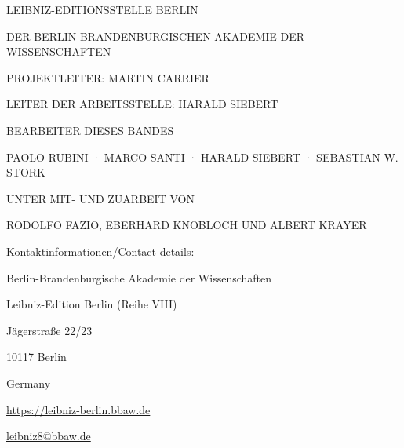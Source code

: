 \begin{titlepage}
\newpage
 \thispagestyle{empty}
\vspace{2mm}%
\par%
LEIBNIZ-EDITIONSSTELLE BERLIN
\par
DER BERLIN-BRANDENBURGISCHEN AKADEMIE DER WISSENSCHAFTEN 
\par
PROJEKTLEITER: MARTIN CARRIER
\par
LEITER DER ARBEITSSTELLE: HARALD SIEBERT
\par %
\vspace{2em}%
\par %
BEARBEITER DIESES BANDES
\par
PAOLO RUBINI · 
MARCO SANTI · HARALD SIEBERT · SEBASTIAN W. STORK
\par
UNTER MIT- UND ZUARBEIT VON
\par
RODOLFO FAZIO, EBERHARD KNOBLOCH UND ALBERT KRAYER
\par %
\vspace{4em}%
\par %
\par %
\vspace{4em}
\par\noindent
Kontaktinformationen/Contact details:
\vspace{0.5em}
\par
Berlin-Brandenburgische Akademie der Wissenschaften
\par
Leibniz-Edition Berlin (Reihe VIII)
\par
Jägerstraße 22/23
\par
10117 Berlin
\par
Germany
\par
\vspace{0.5em}
\href{https://leibniz-berlin.bbaw.de}{https://leibniz-berlin.bbaw.de}
\par
\href{mailto:leibniz8@bbaw.de}{leibniz8@bbaw.de} 
\end{titlepage}























